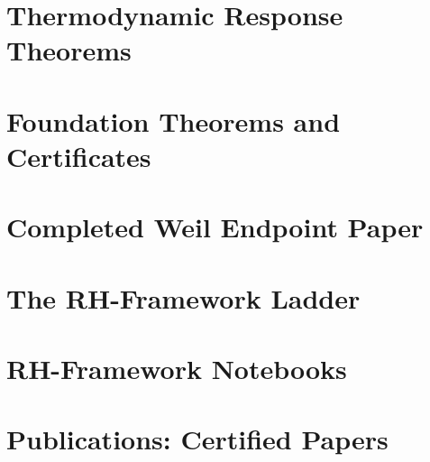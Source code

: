 \documentclass[11pt,openany]{book}
\begin{document}
\part{Thermodynamic Response Theorems}





















\part{Foundation Theorems and Certificates}








\part{Completed Weil Endpoint Paper}





\part{The RH-Framework Ladder}











\part{RH-Framework Notebooks}



\part{Publications: Certified Papers}




















\end{document}
